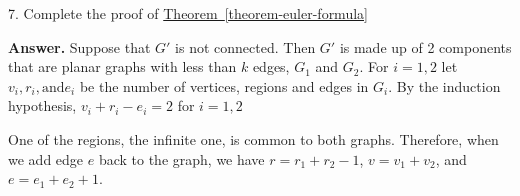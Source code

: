 \documentclass[10pt,]{book}
\theoremstyle{plain}
\theoremstyle{definition}
\theoremstyle{definition}
\theoremstyle{definition}
\theoremstyle{definition}
\theoremstyle{definition}
\numberwithin{equation}{section}
\begin{document}
\begin{exercisegroup}
\item[7.]\hypertarget{exercise-48}{} Complete the proof of \hyperref[theorem-euler-formula]{Theorem~\ref{theorem-euler-formula}}%
\par\smallskip
\par\smallskip
\noindent\textbf{Answer.}\hypertarget{answer-19}{}\quad
 Suppose that \(G'\) is not connected. Then \(G'\) is made up of 2 components that are planar graphs with less than \(k\) edges, \(G_1\)
and \(G_2\). For \(i=1,2\) let \(v_i,r_i, \text{and} e_i\) be the number of vertices, regions and edges in \(G_i\). By the induction hypothesis, \(v_i+r_i-e_i=2\) for \(i=1,2\)%
\par
One of the regions, the infinite one, is common to both graphs. Therefore, when we add edge \(e\) back to the graph, we have \(r=r_1+r_2-1\),
\(v=v_1+v_2\),
and  \(e=e_1+e_2+1\).


\end{exercisegroup}
\end{document}
